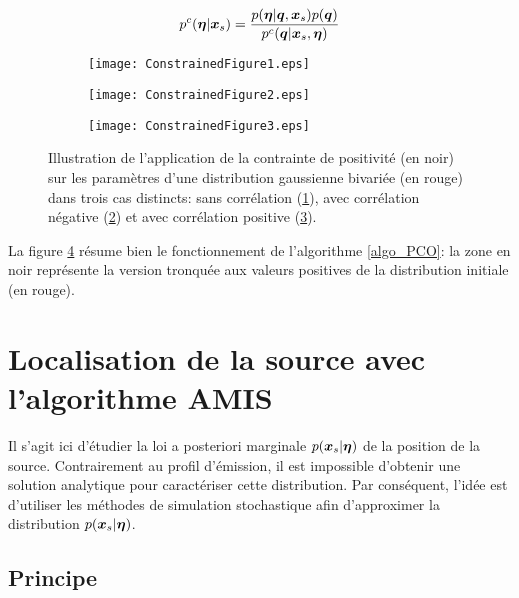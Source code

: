 \begin{equation}
p^c({\bm{\eta}} | {\bm{x}_s}) = \dfrac{p({\bm{\eta}} | {\bm{q}}, {\bm{x}_s})p({\bm{q}})}{p^c({\bm{q}} | {\bm{x}_s}, {\bm{\eta}})}
\label{eq_AE_17}
\end{equation}


 \begin{figure}[h!]
 	\centering
 	\begin{subfigure}[t]{0.5\textwidth}
 		\centering
		\texttt{[image: ConstrainedFigure1.eps]}
		\caption{}
 		\label{fig_AE_2_a}
 	\end{subfigure}%
 	\begin{subfigure}[t]{0.5\textwidth}
 		\centering
		\texttt{[image: ConstrainedFigure2.eps]}
		\caption{}
 		\label{fig_AE_2_b}
 	\end{subfigure}
 	\begin{subfigure}[t]{0.5\textwidth}
 		\centering
 		\texttt{[image: ConstrainedFigure3.eps]}
 		\caption{}
 		\label{fig_AE_2_c}
 	\end{subfigure} 

 	\caption{Illustration de l'application de la contrainte de positivité (en noir) sur les paramètres d'une distribution gaussienne bivariée (en rouge) dans trois cas distincts: sans corrélation (\ref{fig_AE_2_a}), avec corrélation négative (\ref{fig_AE_2_b}) et avec corrélation positive (\ref{fig_AE_2_c}).}
 	 \label{fig_AE_2}	
 \end{figure}

La figure \ref{fig_AE_2} résume bien le fonctionnement de l'algorithme \ref{algo_PCO}: la zone en noir représente la version tronquée aux valeurs positives de la distribution initiale (en rouge). 

\section{Localisation de la source avec l'algorithme AMIS}

Il s'agit ici d'étudier la loi a posteriori marginale $p({\bm{x}_s} | {\bm{\eta}})$ de la position de la source. Contrairement au profil d'émission, il est {impossible} d'obtenir une solution analytique pour caractériser cette distribution. Par conséquent, {l'idée est d'utiliser les méthodes de simulation stochastique afin d'}approximer la distribution $p({\bm{x}_s} | {\bm{\eta}})$. \\

\subsection{Principe}

